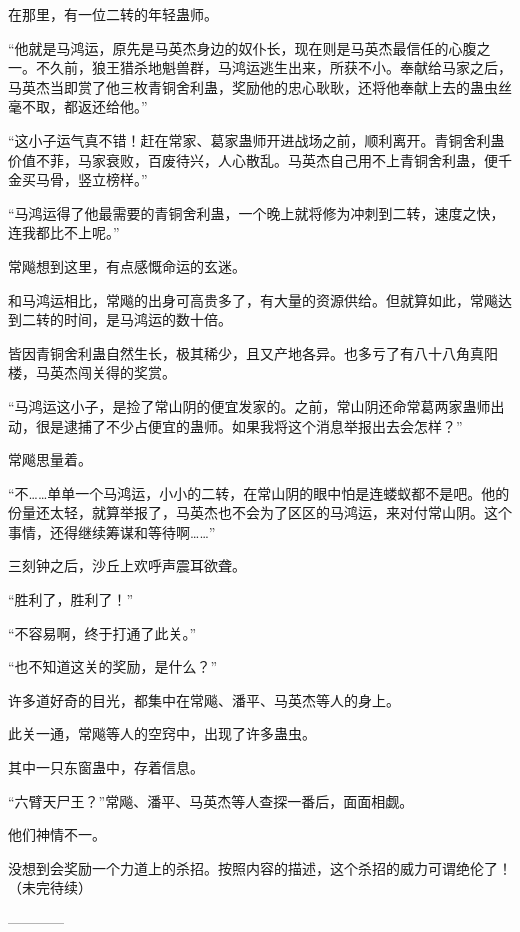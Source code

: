 \begin{this_body}
在那里，有一位二转的年轻蛊师。

“他就是马鸿运，原先是马英杰身边的奴仆长，现在则是马英杰最信任的心腹之一。不久前，狼王猎杀地魁兽群，马鸿运逃生出来，所获不小。奉献给马家之后，马英杰当即赏了他三枚青铜舍利蛊，奖励他的忠心耿耿，还将他奉献上去的蛊虫丝毫不取，都返还给他。”

“这小子运气真不错！赶在常家、葛家蛊师开进战场之前，顺利离开。青铜舍利蛊价值不菲，马家衰败，百废待兴，人心散乱。马英杰自己用不上青铜舍利蛊，便千金买马骨，竖立榜样。”

“马鸿运得了他最需要的青铜舍利蛊，一个晚上就将修为冲刺到二转，速度之快，连我都比不上呢。”

常飚想到这里，有点感慨命运的玄迷。

和马鸿运相比，常飚的出身可高贵多了，有大量的资源供给。但就算如此，常飚达到二转的时间，是马鸿运的数十倍。

皆因青铜舍利蛊自然生长，极其稀少，且又产地各异。也多亏了有八十八角真阳楼，马英杰闯关得的奖赏。

“马鸿运这小子，是捡了常山阴的便宜发家的。之前，常山阴还命常葛两家蛊师出动，很是逮捕了不少占便宜的蛊师。如果我将这个消息举报出去会怎样？”

常飚思量着。

“不……单单一个马鸿运，小小的二转，在常山阴的眼中怕是连蝼蚁都不是吧。他的份量还太轻，就算举报了，马英杰也不会为了区区的马鸿运，来对付常山阴。这个事情，还得继续筹谋和等待啊……”

三刻钟之后，沙丘上欢呼声震耳欲聋。

“胜利了，胜利了！”

“不容易啊，终于打通了此关。”

“也不知道这关的奖励，是什么？”

许多道好奇的目光，都集中在常飚、潘平、马英杰等人的身上。

此关一通，常飚等人的空窍中，出现了许多蛊虫。

其中一只东窗蛊中，存着信息。

“六臂天尸王？”常飚、潘平、马英杰等人查探一番后，面面相觑。

他们神情不一。

没想到会奖励一个力道上的杀招。按照内容的描述，这个杀招的威力可谓绝伦了！（未完待续）

------------

\end{this_body}

